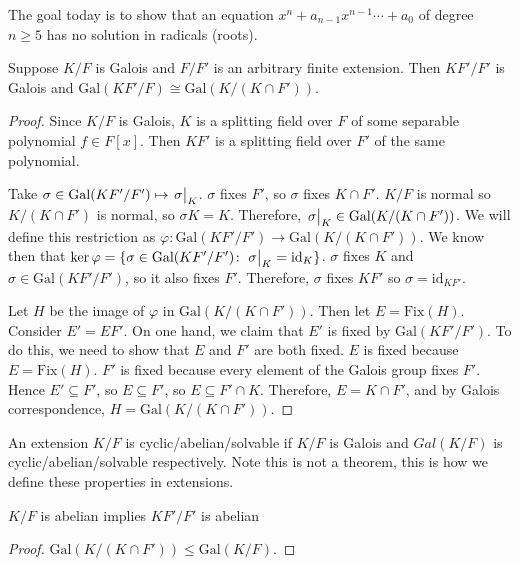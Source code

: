 \documentclass[a4paper,twoside,master.tex]{subfiles}
\begin{document}

The goal today is to show that an equation $ x^n + a_{n-1} x^{n-1} \cdots + a_0 $ of degree $ n \geq 5 $ has no solution in radicals (roots).

\begin{claim}
    Suppose $ K/F $ is Galois and $ F/F' $ is an arbitrary finite extension. Then $ KF'/F' $ is Galois and $ \text{Gal}(KF'/F) \cong \text{Gal}(K/(K \cap F')) $.
\end{claim}
\begin{proof}
    Since $ K/F $ is Galois, $ K $ is a splitting field over $ F $ of some separable polynomial $ f \in F[x] $. Then $ KF' $ is a splitting field over $ F' $ of the same polynomial.

    Take $ \sigma \in \text{Gal}(KF'/F') \mapsto \eval{\sigma}_{K} $. $ \sigma $ fixes $ F' $, so $ \sigma $ fixes $ K \cap F' $. $ K/F $ is normal so $ K/(K \cap F') $ is normal, so $ \sigma K = K $. Therefore, $ \eval{\sigma}_{K} \in \text{Gal}(K/(K \cap F')) $. We will define this restriction as $ \varphi \colon \text{Gal}(KF'/F') \to \text{Gal}(K/(K \cap F')) $. We know then that $ \ker \varphi = \{\sigma \in \text{Gal}(KF'/F') \colon \eval{\sigma}_{K} = \text{id}_K\} $. $ \sigma $ fixes $ K $ and $ \sigma \in \text{Gal}(KF'/F') $, so it also fixes $ F' $. Therefore, $ \sigma $ fixes $ KF' $ so $ \sigma = \text{id}_{KF'} $.

    Let $ H $ be the image of $ \varphi $ in $ \text{Gal}(K/(K \cap F')) $. Then let $ E = \text{Fix}(H) $. Consider $ E' = EF' $. On one hand, we claim that $ E' $ is fixed by $ \text{Gal}(KF'/F') $. To do this, we need to show that $ E $ and $ F' $ are both fixed. $ E $ is fixed because $ E = \text{Fix}(H) $. $ F' $ is fixed because every element of the Galois group fixes $ F' $. Hence $ E' \subseteq F' $, so $ E \subseteq F' $, so $ E\subseteq F' \cap K $. Therefore, $ E = K \cap F' $, and by Galois correspondence, $ H = \text{Gal}(K/(K \cap F')) $.
\end{proof}

\begin{definition}
    An extension $ K/F $ is cyclic/abelian/solvable if $ K/F $ is Galois and $ Gal(K/F) $ is cyclic/abelian/solvable respectively. Note this is not a theorem, this is how we define these properties in extensions.
\end{definition}

\begin{corollary}
    $ K/F $ is abelian implies $ KF'/F' $ is abelian
\end{corollary}
\begin{proof}
    $ \text{Gal}(K/(K \cap F')) \leq \text{Gal}(K/F) $.
\end{proof}
\end{document}
